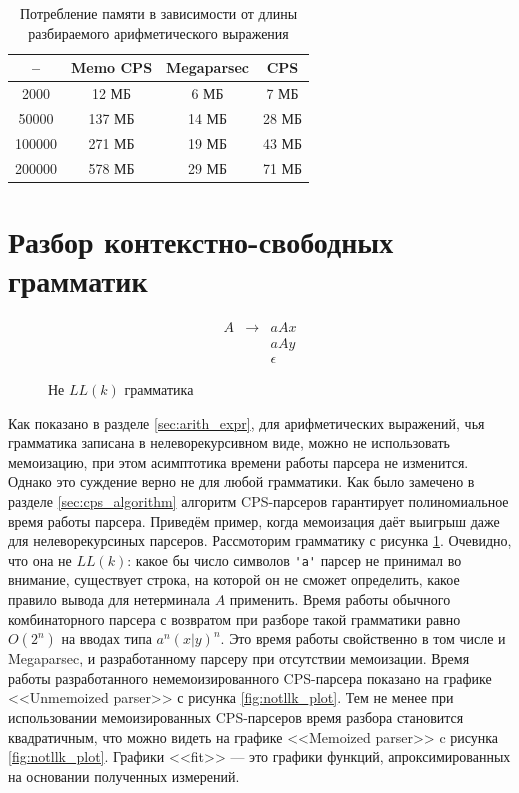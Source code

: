 \documentclass[times]{itmo-student-thesis}
\begin{document}
\begin{table}[!h]
  \caption{Потребление памяти в зависимости от длины разбираемого арифметического выражения}\label{tab:arith_memory}
  \centering
  \begin{tabular}{|*{4}{c|}}\hline
    --     & Memo CPS & Megaparsec & CPS   \\\hline
    2000   & 12 МБ    & 6 МБ       & 7 МБ  \\\hline
    50000  & 137 МБ   & 14 МБ      & 28 МБ \\\hline
    100000 & 271 МБ   & 19 МБ      & 43 МБ \\\hline
    200000 & 578 МБ   & 29 МБ      & 71 МБ \\\hline
  \end{tabular}
\end{table}

\section{Разбор контекстно-свободных грамматик}\label{sec:context_free}

\begin{figure}[!h]
  \caption{Не $LL(k)$ грамматика}\label{fig:not_llk_grmmar}
  \[
      \begin{array}{lll}
          A & \to & a A x \\
            &     & a A y \\
            &     & \epsilon
      \end{array}
  \]
\end{figure}

Как показано в разделе \ref{sec:arith_expr}, для арифметических выражений, чья грамматика записана в нелеворекурсивном
виде, можно не использовать мемоизацию, при этом асимптотика времени работы парсера не изменится. Однако это суждение верно не
для любой грамматики. Как было замечено в разделе \ref{sec:cps_algorithm} алгоритм CPS-парсеров гарантирует полиномиальное время
работы парсера. Приведём пример, когда мемоизация даёт выигрыш даже для нелеворекурсиных парсеров. Рассмоторим
грамматику с рисунка \ref{fig:not_llk_grmmar}. Очевидно, что она не $LL(k)$: какое бы число символов
\lstinline{'a'} парсер не принимал во внимание, существует строка, на которой он не сможет  определить, какое
правило вывода для нетерминала $A$ применить. Время работы обычного комбинаторного парсера с
возвратом при разборе такой грамматики равно $O(2^n)$ на вводах типа $a^n(x|y)^n$. Это время
работы свойственно в том числе и Megaparsec, и разработанному парсеру при отсутствии мемоизации. Время работы разработанного 
немемоизированного CPS-парсера показано на графике <<Unmemoized parser>> с рисунка \ref{fig:notllk_plot}. Тем не менее
при  использовании мемоизированных CPS-парсеров время разбора становится квадратичным, что можно видеть на графике
<<Memoized parser>> c рисунка \ref{fig:notllk_plot}. Графики <<fit>> --- это графики функций, апроксимированных  на
основании полученных измерений.
\end{document}

